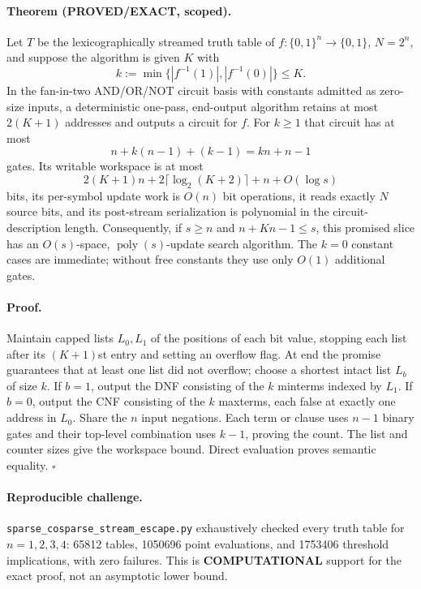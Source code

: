 \documentclass[11pt]{article}
\begin{document}
\paragraph{Theorem (\textbf{PROVED/EXACT}, scoped).}
Let $T$ be the lexicographically streamed truth table of
$f:\{0,1\}^n\to\{0,1\}$, $N=2^n$, and suppose the algorithm is given $K$
with
\[
 k:=\min\{|f^{-1}(1)|,|f^{-1}(0)|\}\le K.
\]
In the fan-in-two AND/OR/NOT circuit basis with constants admitted as
zero-size inputs, a deterministic one-pass, end-output algorithm retains at
most $2(K+1)$ addresses and outputs a circuit for $f$.  For $k\ge1$ that
circuit has at most
\[
 n+k(n-1)+(k-1)=kn+n-1
\]
gates.  Its writable workspace is at most
\[
2(K+1)n+2\lceil\log_2(K+2)\rceil+n+O(\log s)
\]
bits, its per-symbol update work is $O(n)$ bit operations, it reads exactly
$N$ source bits, and its post-stream serialization is polynomial in the
circuit-description length.  Consequently, if $s\ge n$ and
$n+Kn-1\le s$, this promised slice has an $O(s)$-space,
$\operatorname{poly}(s)$-update search algorithm.  The $k=0$ constant cases
are immediate; without free constants they use only $O(1)$ additional gates.

\paragraph{Proof.}
Maintain capped lists $L_0,L_1$ of the positions of each bit value, stopping
each list after its $(K+1)$st entry and setting an overflow flag.  At end the
promise guarantees that at least one list did not overflow; choose a shortest
intact list $L_b$ of size $k$.  If $b=1$, output the DNF consisting of the
$k$ minterms indexed by $L_1$.  If $b=0$, output the CNF consisting of the
$k$ maxterms, each false at exactly one address in $L_0$.  Share the $n$
input negations.  Each term or clause uses $n-1$ binary gates and their
top-level combination uses $k-1$, proving the count.  The list and counter
sizes give the workspace bound.  Direct evaluation proves semantic equality.
\hfill$\square$

\paragraph{Reproducible challenge.}
\texttt{sparse\_cosparse\_stream\_escape.py} exhaustively checked every
truth table for $n=1,2,3,4$: 65812 tables, 1050696 point evaluations, and
1753406 threshold implications, with zero failures.  This is
\textbf{COMPUTATIONAL} support for the exact proof, not an asymptotic lower
bound.
\end{document}

